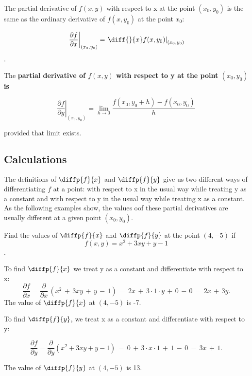 \documentclass[12pt,a4paper,draft]{article}
\newenvironment{definition}{\begin{definitionbox}}{\end{definitionbox}\vspace{1\baselineskip}}
\begin{document}
The partial derivative of \(f(x,y)\) with respect to x at the point \((x_0,y_0)\) is the same as the ordinary derivative of \(f(x,y_0)\) at the point \(x_0\):

\[\left. \frac{\partial f}{\partial x} \right|_{(x_0, y_0)} = \left. \diff{}{x}f(x,y_0)\right|_{(x_0, y_0)} \].


\begin{definition}
    The \textbf{partial derivative of \(f(x,y)\) with respect to y at the point \((x_0,y_0)\) is}

    \[\left. \frac{\partial f}{\partial y} \right|_{(x_0, y_0)} = \lim_{h \to 0}\frac{f(x_0,y_0+h)-f(x_0,y_0)}{h}\]

    provided that limit exists.


\end{definition}

\subsection{Calculations}

The definitions of \(\diffp{f}{x}\) and \(\diffp{f}{y}\) give us two different ways of differentiating \(f\) at a point: with respect to x in the usual way while treating y as a constant and with respect to y in the usual way while treating x as a constant. As the following examples show, the values oof these partial derivatives are usually different at a given point \((x_0,y_0)\).

\begin{example}
    Find the values of \(\diffp{f}{x}\) and \(\diffp{f}{y}\) at the point \((4,-5)\) if 
    \[f(x,y) = x^2 + 3xy + y -1\].

\end{example}

\begin{solution}
    To find \(\diffp{f}{x}\) we treat y as a constant and differentiate with respect to x:
    \[{\frac{\partial f}{\partial x}}={\frac{\partial}{\partial x}}\,(x^{2}\,+\,3x y\,+\,y\,-\,1)\,=\,2x\,+\,3\cdot1\cdot y\,+\,0\,-\,0\,=\,2x\,+\,3y.\]
    The value of \(\diffp{f}{x}\) at \((4,-5)\) is -7.

    To find  \(\diffp{f}{y}\), we treat x as a constant and differentiate with respect to y:

    \[{\frac{\partial f}{\partial y}}={\frac{\partial}{\partial y}}\left(x^{2}+3x y+y-1\right)\,=\,0\,+\,3\cdot x\cdot1\,+\,1\,-\,0\,=\,3x\,+\,1.\]

    The value of \(\diffp{f}{y}\) at \((4,-5)\) is 13.


\end{solution}
\end{document}
